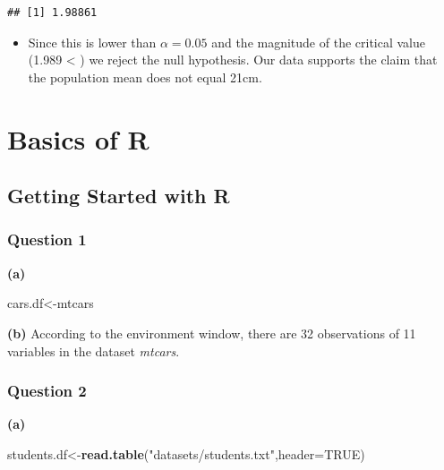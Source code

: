 \documentclass[
  openany]{book}
\newenvironment{Shaded}{\begin{snugshade}}{\end{snugshade}}
\newcommand{\AttributeTok}[1]{\textcolor[rgb]{0.13,0.29,0.53}{#1}}
\newcommand{\ConstantTok}[1]{\textcolor[rgb]{0.56,0.35,0.01}{#1}}
\newcommand{\FunctionTok}[1]{\textcolor[rgb]{0.13,0.29,0.53}{\textbf{#1}}}
\newcommand{\NormalTok}[1]{#1}
\newcommand{\OtherTok}[1]{\textcolor[rgb]{0.56,0.35,0.01}{#1}}
\newcommand{\StringTok}[1]{\textcolor[rgb]{0.31,0.60,0.02}{#1}}
\providecommand{\tightlist}{%
  \setlength{\itemsep}{0pt}\setlength{\parskip}{0pt}}
\begin{document}
\begin{verbatim}
## [1] 1.98861
\end{verbatim}

\begin{itemize}
\tightlist
\item
  Since this is lower than \(\alpha=0.05\) and the magnitude of the critical value (1.989 \textless{} \textbar) we reject the null hypothesis. Our data supports the claim that the population mean does not equal 21cm.
\end{itemize}

\chapter{Basics of R}\label{basics-of-r}

\section{Getting Started with R}\label{getting-started-with-r}

\subsection{Question 1}\label{question-1}

\textbf{(a)}

\begin{Shaded}
\begin{Highlighting}[]
\NormalTok{cars.df}\OtherTok{\textless{}{-}}\NormalTok{mtcars}
\end{Highlighting}
\end{Shaded}

\textbf{(b)}
According to the environment window, there are 32 observations of 11 variables in the dataset \emph{mtcars}.

\subsection{Question 2}\label{question-2}

\textbf{(a)}

\begin{Shaded}
\begin{Highlighting}[]
\NormalTok{students.df}\OtherTok{\textless{}{-}}\FunctionTok{read.table}\NormalTok{(}\StringTok{"datasets/students.txt"}\NormalTok{,}\AttributeTok{header=}\ConstantTok{TRUE}\NormalTok{)}
\end{Highlighting}
\end{Shaded}
\end{document}
